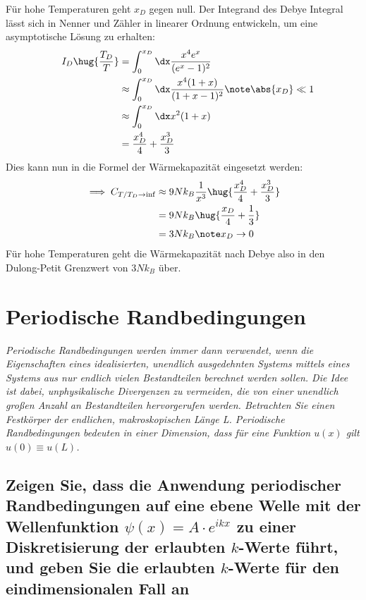 \documentclass[exa]{exercise_5.0}
\begin{document}
Für hohe Temperaturen geht $x_D$ gegen null. Der Integrand des Debye Integral lässt sich in Nenner und Zähler in linearer Ordnung entwickeln, um eine asymptotische Lösung zu erhalten:
\begin{align*}
    \quad I_D\hug {\frac{T_D}T}
    &= \int_0^{x_D} \dx\frac{x^4 e^x}{(e^x - 1)^2}\\
    &\approx \int_0^{x_D} \dx\frac{x^4 (1+x)}{(1+x - 1)^2}\note \abs{x_D}\ll 1\\
    &\approx \int_0^{x_D} \dx x^2(1+x)\\
    &= \frac{x_D^4}{4} + \frac{x_D^3}{3}
\end{align*}
Dies kann nun in die Formel der Wärmekapazität eingesetzt werden:
\begin{align*}
    \implies C_{T/T_D\to\inf} 
    &\approx 9 N k_B \frac1 {x^3} \hug{\frac{x_D^4}{4} + \frac{x_D^3}{3}}\\
    &= 9 N k_B \hug{\frac{x_D}{4} + \frac{1}{3}}\\
    &= 3 N k_B \note x_D\to 0\\
\end{align*}
Für hohe Temperaturen geht die Wärmekapazität nach Debye also in den Dulong-Petit Grenzwert von $3N k_B$ über.

\section{Periodische Randbedingungen}
{\it Periodische Randbedingungen werden immer dann verwendet, wenn die Eigenschaften eines idealisierten, unendlich ausgedehnten Systems mittels eines Systems aus nur endlich vielen Bestandteilen berechnet werden sollen. Die Idee ist dabei, unphysikalische Divergenzen zu vermeiden, die
von einer unendlich großen Anzahl an Bestandteilen hervorgerufen werden.
Betrachten Sie einen Festkörper der endlichen, makroskopischen Länge L. Periodische Randbedingungen bedeuten in einer Dimension, dass  für eine Funktion $u(x)$ gilt $u(0)\equiv u(L)$.}

\subsection{Zeigen Sie, dass die Anwendung periodischer Randbedingungen auf eine ebene Welle mit
der Wellenfunktion $\psi(x) = A \cdot e^{ikx}$ zu einer Diskretisierung der erlaubten $k$-Werte führt,
und geben Sie die erlaubten $k$-Werte für den eindimensionalen Fall an}

\dottedlinete
\end{document}
